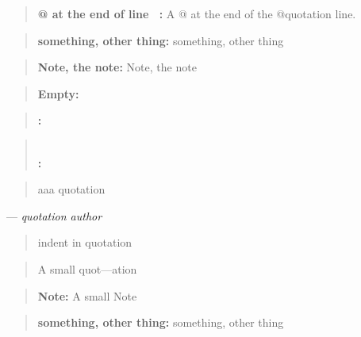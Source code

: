 \documentclass{book}
\begin{document}
\begin{titlepage}
\begin{quote}
\textbf{@ at the end of line \ {}:} A @ at the end of the @quotation line.
\end{quote}

\begin{quote}
\textbf{something, other thing:} something, other thing
\end{quote}

\begin{quote}
\textbf{Note, the note:} Note, the note
\end{quote}

\begin{quote}
\end{quote}

\begin{quote}
\textbf{Empty:} \end{quote}

\begin{quote}
\textbf{:} \end{quote}

\begin{quote}
\textbf{\leavevmode{}\\:} \end{quote}

\begin{quote}
aaa quotation
\end{quote}
\begin{center}
--- \emph{quotation author}
\end{center}

\begin{quote}
indent in quotation
\end{quote}

\begin{quote}
\begin{footnotesize}
A small quot---ation
\end{footnotesize}
\end{quote}

\begin{quote}
\begin{footnotesize}
\textbf{Note:} A small Note
\end{footnotesize}
\end{quote}

\begin{quote}
\begin{footnotesize}
\textbf{something, other thing:} something, other thing
\end{footnotesize}
\end{quote}


\end{titlepage}
\end{document}
